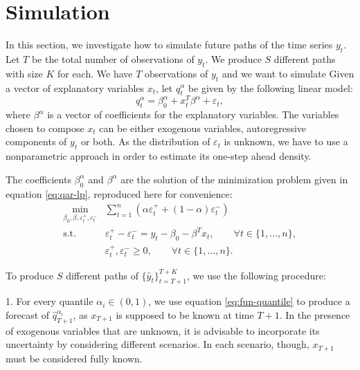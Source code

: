 \section{Simulation}

In this section, we investigate how to simulate future paths of the time series $y_t$. 
Let $T$ be the total number of observations of $y_t$. We produce $S$ different paths with size $K$ for each. 
We have $T$ observations of $y_t$ and we want to simulate  Given a vector of explanatory variables $x_t$, let $q_t^\alpha$ be given by the following linear model:
\begin{equation}
q_t^\alpha = \beta_0^\alpha +  x_t^T \beta^\alpha + \varepsilon_t,
\label{eq:fun-quantile}
\end{equation}
where $\beta^\alpha$ is a vector of coefficients for the explanatory variables. The variables chosen to compose $x_t$ can be either exogenous variables, autoregressive components of $y_t$ or both. As the distribution of $\varepsilon_t$ is unknown, we have to use a nonparametric approach in order to estimate its one-step ahead density.

The coefficients $\beta_0^\alpha$ and $\beta^\alpha$ are the solution of the minimization problem given in equation \ref{eq:qar-lp}, reproduced here for convenience:
\begin{equation}
\begin{aligned}\min_{\beta_0,\beta,\varepsilon_{t}^{+},\varepsilon_{t}^{-}} & \sum_{t=1}^{n}\left(\alpha\varepsilon_{t}^{+}+(1-\alpha)\varepsilon_{t}^{-}\right)\\
\mbox{s.t. } & \varepsilon_{t}^{+}-\varepsilon_{t}^{-}=y_{t} - \beta_0 - \beta^T x_{t},\qquad\forall t\in\{1,\dots,n\},\\
& \varepsilon_t^+,\varepsilon_t^- \geq 0, \qquad \forall t \in \{1,\dots,n\}.
\end{aligned}
\label{eq:problem-quantile-regression}
\end{equation}

To produce $S$ different paths of $\{ \hat{y}_t \}_{t=T+1}^{T+K}$, we use the following procedure:

1. For every quantile $\alpha_i \in (0,1)$, we use equation \ref{eq:fun-quantile} to produce a forecast of $\hat{q}^{\alpha_i}_{T+1}$, as $x_{T+1}$ is supposed to be known at time $T+1$. In the presence of exogenous variables that are unknown, it is advisable to incorporate its uncertainty by considering different scenarios. In each scenario, though, $x_{T+1}$ must be considered fully known. 

